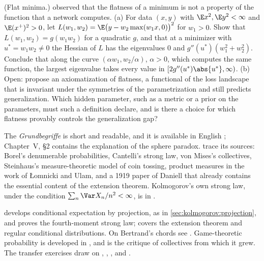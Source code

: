 \begin{refsection}
\begin{exercises}
\item\label{ex:kolmogorov:flat} \research\harder (Flat minima.) \textcite{DinhPascanuBengioBengio2017} observed that the flatness of a minimum is not a property of the function that a network computes. (a) For data $(x,y)$ with $\E x^2,\E y^2<\infty$ and $\E(x^+)^2>0$, let $L(w_1,w_2)=\E\bigl(y-w_2\max(w_1x,0)\bigr)^2$ for $w_1>0$. Show that $L(w_1,w_2)=g(w_1w_2)$ for a quadratic $g$, and that at a minimizer with $u^*=w_1w_2\ne0$ the Hessian of $L$ has the eigenvalues $0$ and $g''(u^*)(w_1^2+w_2^2)$. Conclude that along the curve $(\alpha w_1,w_2/\alpha)$, $\alpha>0$, which computes the same function, the largest eigenvalue takes every value in $[2g''(u^*)\abs{u^*},\infty)$. (b) Open: propose an axiomatization of flatness, a functional of the loss landscape that is invariant under the symmetries of the parametrization and still predicts generalization. Which hidden parameter, such as a metric or a prior on the parameters, must such a definition declare, and is there a choice for which flatness provably controls the generalization gap?
\end{exercises}

\notesandrefs

The \emph{Grundbegriffe} \parencite{Kolmogorov1933} is short and readable, and it is available in English \parencite{Kolmogorov1956}; Chapter~V, §2 contains the explanation of the sphere paradox. \textcite{ShaferVovk2006} trace its sources: Borel's denumerable probabilities, Cantelli's strong law, von Mises's collectives, Steinhaus's measure-theoretic model of coin tossing, product measures in the work of Łomnicki and Ulam, and a 1919 paper of Daniell that already contains the essential content of the extension theorem. Kolmogorov's own strong law, under the condition $\sum_n\Var X_n/n^2<\infty$, is in \textcite{Kolmogorov1930}.

\textcite{Williams1991} develops conditional expectation by projection, as in \cref{sec:kolmogorov:projection}, and proves the fourth-moment strong law; \textcite{Durrett2019} covers the extension theorem and regular conditional distributions. On Bertrand's chords see \textcite{Jaynes1973}. Game-theoretic probability is developed in \textcite{ShaferVovk2019}, and \textcite{Ville1939} is the critique of collectives from which it grew. The transfer exercises draw on \textcite{Shannon1948}, \textcite{Faddeev1956}, \textcite{DinurNissim2003}, and \textcite{DworkMcSherryNissimSmith2006}.

\printchapterbib
\end{refsection}
